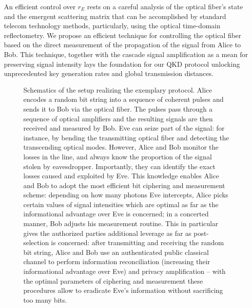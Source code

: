 \documentclass[a4paper]{article}
\begin{document}
An efficient control over $r_E$ rests on a careful analysis of the optical fiber's state and the emergent scattering matrix that can be accomplished by standard telecom technology methods, particularly, using the optical time-domain reflectometry.
We propose an efficient technique for controlling the optical fiber based on the direct measurement of the propagation of the signal from Alice to Bob.
This technique, together with the cascade signal amplification as a mean for preserving signal intensity lays the foundation for our QKD protocol unlocking unprecedented key generation rates and global transmission distances.





 

\begin{figure}[t]
    \noindent{}
    \caption{
    Schematics of the setup realizing the exemplary protocol. 
    Alice encodes a random bit string into a sequence of coherent pulses and sends it to Bob via the optical fiber. 
    The pulses pass through a sequence of optical amplifiers and the resulting signals are then received and measured by Bob.
    Eve can seize part of the signal: for instance, by bending the transmitting optical fiber and detecting the transcending optical modes. 
    However, Alice and Bob monitor the losses in the line, and always know the proportion of the signal stolen by eavesdropper.
    Importantly, they can identify the exact losses caused and exploited by Eve.
    This knowledge enables Alice and Bob to adopt the most efficient bit ciphering and measurement scheme: depending on how many photons Eve intercepts, Alice picks certain values of signal intensities which are optimal as far as the informational advantage over Eve is concerned; in a concerted manner, Bob adjusts his measurement routine.
    This in particular gives the authorized parties additional leverage as far as post-selection is concerned: after transmitting and receiving the random bit string, Alice and Bob use an authenticated public classical channel to perform information reconciliation (increasing their informational advantage over Eve) and privacy amplification -- with the optimal parameters of ciphering and measurement these procedures allow to eradicate Eve's information without sacrificing too many bits. 
    } 
    \label{Fig1}
\end{figure}
\end{document}
